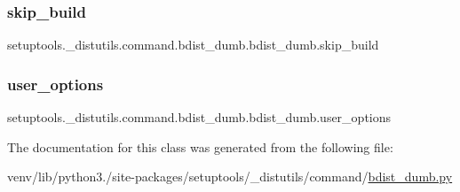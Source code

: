 \subsubsection{\texorpdfstring{skip\+\_\+build}{skip\_build}}
{\footnotesize\ttfamily setuptools.\+\_\+distutils.\+command.\+bdist\+\_\+dumb.\+bdist\+\_\+dumb.\+skip\+\_\+build}

\mbox{\label{classsetuptools_1_1__distutils_1_1command_1_1bdist__dumb_1_1bdist__dumb_a44aa75f13e365b5c33dcdedf55c52831}} 
\subsubsection{\texorpdfstring{user\+\_\+options}{user\_options}}
{\footnotesize\ttfamily setuptools.\+\_\+distutils.\+command.\+bdist\+\_\+dumb.\+bdist\+\_\+dumb.\+user\+\_\+options\hspace{0.3cm}{\ttfamily [static]}}



The documentation for this class was generated from the following file\+:\begin{DoxyCompactItemize}
\item 
venv/lib/python3./site-\/packages/setuptools/\+\_\+distutils/command/\hyperlink{bdist__dumb_8py}{bdist\+\_\+dumb.\+py}\end{DoxyCompactItemize}
